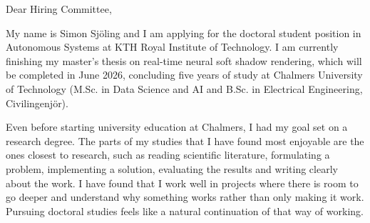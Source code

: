\documentclass[a4paper,11pt]{letter}
\begin{document}





Dear Hiring Committee,

My name is Simon Sj\"oling and I am applying for the doctoral student position in Autonomous Systems at KTH Royal Institute of Technology. I am currently finishing my master's thesis on real-time neural soft shadow rendering, which will be completed in June 2026, concluding five years of study at Chalmers University of Technology (M.Sc. in Data Science and AI and B.Sc. in Electrical Engineering, Civilingenjör).



Even before starting university education at Chalmers, I had my goal set on a research degree.
The parts of my studies that I have found most enjoyable are the ones closest to research, such as reading scientific literature, formulating a problem, implementing a solution, evaluating the results and writing clearly about the work.
I have found that I work well in projects where there is room to go deeper and understand why something works rather than only making it work. Pursuing doctoral studies feels like a natural continuation of that way of working.


\end{document}
